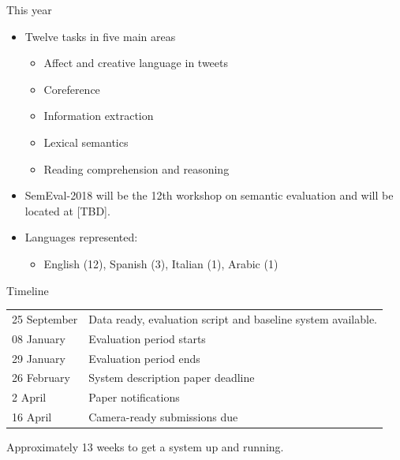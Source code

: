 \documentclass[10pt, compress]{beamer}
\begin{document}
\begin{frame}{This year}

\begin{itemize}
  \item Twelve tasks in five main areas
  \begin{itemize}
     \item  Affect and creative language in tweets
     \item  Coreference
     \item  Information extraction
     \item  Lexical semantics
     \item  Reading comprehension and reasoning
  \end{itemize}
  \item SemEval-2018 will be the 12th workshop on semantic evaluation and will be located at [TBD]. 
  \item Languages represented:
  \begin{itemize} 
    \item English (12), Spanish (3), Italian (1), Arabic (1)
  \end{itemize}
\end{itemize}
%

\end{frame}

\begin{frame}{Timeline}

\begin{tabular}{ll}

25 September & Data ready, evaluation script and baseline system available. \\
08 January   & Evaluation period starts \\
29 January   & Evaluation period ends \\
26 February  & System description paper deadline \\
2  April     & Paper notifications \\
16 April     & Camera-ready submissions due \\
\end{tabular}

Approximately 13 weeks to get a system up and running.

\end{frame}
\end{document}
